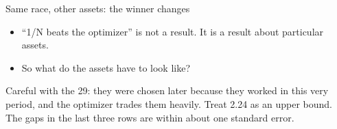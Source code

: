 \documentclass[aspectratio=169,10pt]{beamer}
\begin{document}
\begin{frame}{Same race, other assets: the winner changes}
\vskip 4pt
\begin{center}
\renewcommand{\arraystretch}{1.4}
\end{center}
\vskip 12pt
\begin{itemize}
\item ``1/N beats the optimizer'' is not a result. It is a result about particular assets.
\vskip 6pt
\item So what do the assets have to look like?
\end{itemize}
\vskip 8pt
{\small Careful with the 29: they were chosen later because they worked in this very period, and the optimizer trades them heavily. Treat 2.24 as an upper bound. The gaps in the last three rows are within about one standard error.}
\end{frame}
\end{document}
